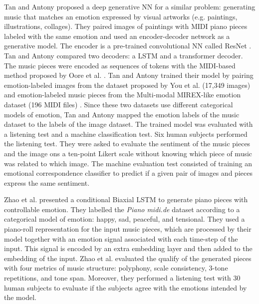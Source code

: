 Tan and Antony \cite{tan2020automated} proposed a deep generative NN for a similar problem: generating music that matches an emotion expressed by visual artworks (e.g. paintings, illustrations, collages). They paired images of paintings with MIDI piano pieces labeled with the same emotion and used an encoder-decoder network as a generative model. The encoder is a pre-trained convolutional NN called ResNet \cite{he2016deep}. Tan and Antony \cite{tan2020automated} compared two decoders: a LSTM and a transformer decoder.
The music pieces were encoded as sequences of tokens with the MIDI-based method proposed by Oore et al. \cite{oore2017learning}. Tan and Antony \cite{tan2020automated} trained their model by pairing emotion-labeled images from the dataset proposed by You et al. \cite{you2016building} (17,349 images) and emotion-labeled music pieces from the Multi-modal MIREX-like emotion dataset (196 MIDI files) \cite{panda2013multi}. Since these two datasets use different categorical models of emotion, Tan and Antony \cite{tan2020automated} mapped the emotion labels of the music dataset to the labels of the image dataset. The trained model was evaluated with a listening test and a machine classification test. Six human subjects performed the listening test. They were asked to evaluate the sentiment of the music pieces and the image ons a ten-point Likert scale without knowing which piece of music was related to which image. The machine evaluation test consisted of training an emotional correspondence classifier to predict if a given pair of images and pieces express the same sentiment.

Zhao et al. \cite{zhao2019emotional} presented a conditional Biaxial LSTM \cite{johnson2017generating} to generate piano pieces with controllable emotion. They labelled the \textit{Piano midi.de} dataset according to a categorical model of emotion: happy, sad, peaceful, and tensional. They used a piano-roll representation for the input music pieces, which are processed by their model together with an emotion signal associated with each time-step of the input. This signal is encoded by an extra embedding layer and then added to the embedding of the input. Zhao et al. \cite{zhao2019emotional} evaluated the qualify of the generated pieces with four metrics of music structure: polyphony, scale consistency, 3-tone repetitions, and tone span. Moreover, they performed a listening test with 30 human subjects to evaluate if the subjects agree with the emotions intended by the model.

